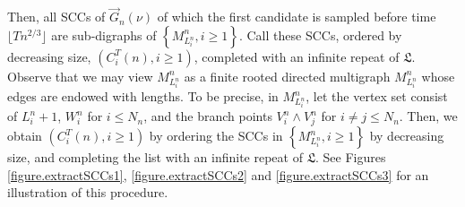 Then, all SCCs of $\vec{G}_n(\nu)$ of which the first candidate is sampled before time $\lfloor Tn^{2/3}\rfloor$ are sub-digraphs of $\left\{M^n_{L_i^n}, i\geq 1 \right\}$. Call these SCCs, ordered by decreasing size, $(C_i^T(n),i\geq 1)$, completed with an infinite repeat of $\mathfrak{L}$. Observe that we may view $M^n_{L_i^n}$ as a finite rooted directed multigraph $M^n_{L_i^n}$ whose edges are endowed with lengths. To be precise, in  $M^n_{L_i^n}$, let the vertex set consist of $L_i^n+1$, $W_i^n$ for $i\leq N_n$, and the branch points $V_i^n\wedge V_j^n$ for $i\neq j\leq N_n$. Then, we obtain $(C_i^T(n),i\geq 1)$ by ordering the SCCs in $\left\{M^n_{L_i^n}, i\geq 1 \right\}$ by decreasing size, and completing the list with an infinite repeat of $\mathfrak{L}$. See Figures \ref{figure.extractSCCs1}, \ref{figure.extractSCCs2} and \ref{figure.extractSCCs3} for an illustration of this procedure.

